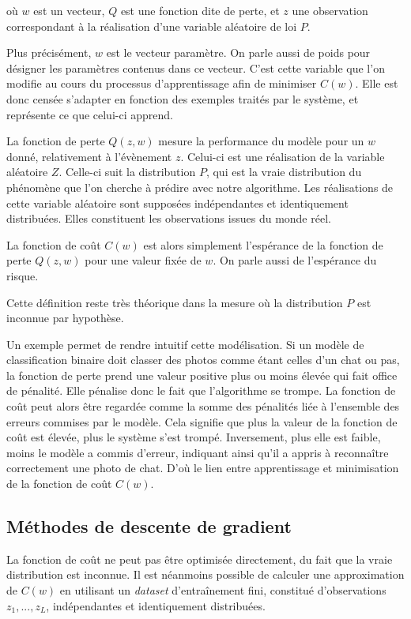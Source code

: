 \documentclass{article}
\begin{document}
où $w$ est un vecteur, $Q$ est une fonction dite de perte, et $z$ une observation correspondant à la réalisation d'une variable aléatoire de loi $P$.
\bigskip

Plus précisément, $w$ est le vecteur paramètre. On parle aussi de poids pour désigner les paramètres contenus dans ce vecteur. C'est cette variable que l'on modifie au cours du processus d'apprentissage afin de minimiser $C(w)$. Elle est donc censée s'adapter en fonction des exemples traités par le système, et représente ce que celui-ci apprend. 

La fonction de perte $Q(z, w)$ mesure la performance du modèle pour un $w$ donné, relativement à l'évènement $z$. Celui-ci est une réalisation de la variable aléatoire $Z$. Celle-ci suit la distribution $P$, qui est la vraie distribution du phénomène que l'on cherche à prédire avec notre algorithme. Les réalisations de cette variable aléatoire sont supposées indépendantes et identiquement distribuées. Elles constituent les observations issues du monde réel. 

La fonction de coût $C(w)$ est alors simplement l'espérance de la fonction de perte $Q(z, w)$ pour une valeur fixée de $w$. On parle aussi de l'espérance du risque. 

Cette définition reste très théorique dans la mesure où la distribution $P$ est inconnue par hypothèse.  
\bigskip

Un exemple permet de rendre intuitif cette modélisation. Si un modèle de classification binaire doit classer des photos comme étant celles d'un chat ou pas, la fonction de perte prend une valeur positive plus ou moins élevée qui fait office de pénalité. Elle pénalise donc le fait que l'algorithme se trompe. La fonction de coût peut alors être regardée comme la somme des pénalités liée à l'ensemble des erreurs commises par le modèle. Cela signifie que plus la valeur de la fonction de coût est élevée, plus le système s'est trompé. Inversement, plus elle est faible, moins le modèle a commis d'erreur, indiquant ainsi qu'il a appris à reconnaître correctement une photo de chat. D'où le lien entre apprentissage et minimisation de la fonction de coût $C(w)$.

\subsection{Méthodes de descente de gradient}

La fonction de coût ne peut pas être optimisée directement, du fait que la vraie distribution est inconnue. Il est néanmoins possible de calculer une approximation de $C(w)$ en utilisant un \emph{dataset} d'entraînement fini, constitué d'observations $z_1, ..., z_L$, indépendantes et identiquement distribuées.
\end{document}
